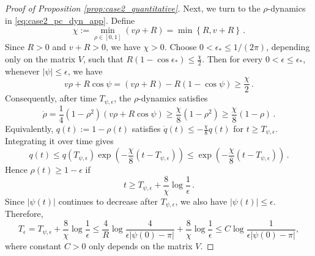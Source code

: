\documentclass[10pt]{article}
\theoremstyle{definition}
\theoremstyle{definition}
\numberwithin{equation}{section}
\newcommand{\Drho}{\Dot{\rho}}
\begin{document}
\begin{proof}[Proof of Proposition \ref{prop:case2_quantitative}]
Next, we turn to the $\rho$-dynamics in \eqref{eq:case2_pc_dyn_app}.
Define
\begin{equation*}
\chi := \min_{\rho \in [0,1]} (v \rho + R) = \min \left\{ R, v+R \right\} \, .
\end{equation*}
Since $R > 0$ and $v+R > 0$, we have $\chi > 0$.
Choose $0 < \epsilon_* \leq 1/(2\pi) $, depending only on the matrix $V$, such that $R(1 - \cos \epsilon_*) \leq \frac{\chi}{2}$.
Then for every $0 < \epsilon \leq \epsilon_*$, whenever $|\psi| \leq \epsilon$, we have
\begin{equation*}
    v \rho + R \cos \psi = (v\rho + R) - R(1 - \cos\psi) \geq \frac{\chi}{2} \, .
\end{equation*}
Consequently, after time $T_{\psi, \epsilon}$, the $\rho$-dynamics satisfies
\begin{equation*}
\Drho = \frac{1}{4} (1 - \rho^2) (v\rho + R \cos\psi) \geq \frac{\chi}{8} (1-\rho^2) \geq \frac{\chi}{8} (1-\rho) \, .
\end{equation*}
Equivalently, $q(t) := 1 - \rho(t)$ satisfies $\dot{q}(t) \leq -\frac{\chi}{8} q(t)$ for $t \geq T_{\psi, \epsilon}$.
Integrating it over time gives
\begin{equation*}
q(t) \leq q(T_{\psi, \epsilon}) \exp \left( -\frac{\chi}{8} (t - T_{\psi,\epsilon}) \right) \leq \exp \left( -\frac{\chi}{8} (t - T_{\psi,\epsilon}) \right) \, .
\end{equation*}
Hence $\rho(t) \geq 1 - \epsilon$ if 
\begin{equation*}
    t \geq T_{\psi, \epsilon} + \frac{8}{\chi} \log \frac{1}{\epsilon} \, .
\end{equation*}
Since $|\psi(t)|$ continues to decrease after $T_{\psi, \epsilon}$, we also have $|\psi(t)| \leq \epsilon$.
Therefore,
\begin{equation*}
T_{\epsilon} = T_{\psi, \epsilon} + \frac{8}{\chi} \log \frac{1}{\epsilon} \leq \frac{4}{R} \log \frac{4}{\epsilon |\psi(0) - \pi|} + \frac{8}{\chi} \log \frac{1}{\epsilon} \leq C  \log \frac{1}{\epsilon |\psi(0) - \pi|},
\end{equation*}
where constant $C > 0$ only depends on the matrix $V$.
\end{proof}
\end{document}
